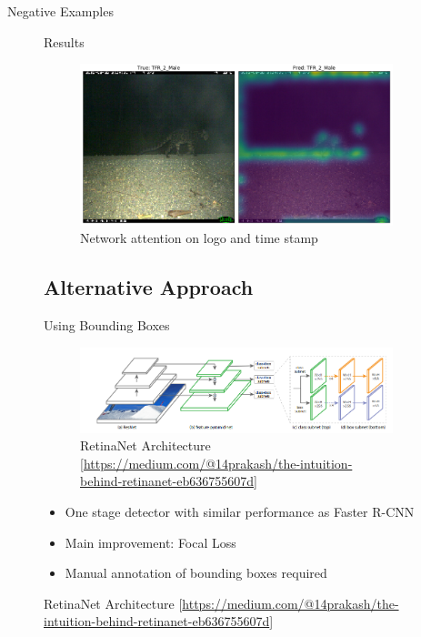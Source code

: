 \documentclass[10pt]{beamer}
\begin{document}
\begin{frame}{Negative Examples}
\begin{figure}
\begin{frame}{Results}
	\begin{figure}
		\includegraphics[width=\columnwidth]{images/Attention_Leo_Stamp2.png}
		\caption{Network attention on logo and time stamp}
	\end{figure}
\end{frame}

\subsection{Alternative Approach}
\begin{frame}{Using Bounding Boxes}
	\begin{figure}
		\includegraphics[width=\columnwidth]{images/retinanet.png}
		\caption{RetinaNet Architecture [\url{https://medium.com/@14prakash/the-intuition-behind-retinanet-eb636755607d}]}
	\end{figure}

	\begin{itemize}
		\item One stage detector with similar performance as Faster R-CNN
		\item Main improvement: Focal Loss
		\item Manual annotation of bounding boxes required
	\end{itemize}
\end{frame}


\end{figure}
\end{frame}
\end{document}
